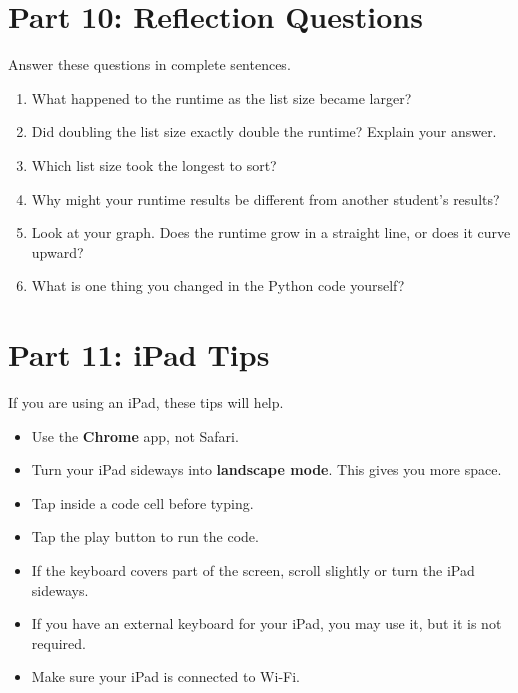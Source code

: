 \documentclass[11pt]{article}
\begin{document}
\section*{Part 10: Reflection Questions}

Answer these questions in complete sentences.

\begin{enumerate}
    \item What happened to the runtime as the list size became larger?

    \vspace{0.5in}

    \item Did doubling the list size exactly double the runtime? Explain your answer.

    \vspace{0.5in}

    \item Which list size took the longest to sort?

    \vspace{0.5in}

    \item Why might your runtime results be different from another student's results?

    \vspace{0.5in}

    \item Look at your graph. Does the runtime grow in a straight line, or does it curve upward?

    \vspace{0.5in}

    \item What is one thing you changed in the Python code yourself?

    \vspace{0.5in}
\end{enumerate}

\section*{Part 11: iPad Tips}

If you are using an iPad, these tips will help.

\begin{itemize}
    \item Use the \textbf{Chrome} app, not Safari.
    \item Turn your iPad sideways into \textbf{landscape mode}. This gives you more space.
    \item Tap inside a code cell before typing.
    \item Tap the play button to run the code.
    \item If the keyboard covers part of the screen, scroll slightly or turn the iPad sideways.
    \item If you have an external keyboard for your iPad, you may use it, but it is not required.
    \item Make sure your iPad is connected to Wi-Fi.
\end{itemize}
\end{document}
